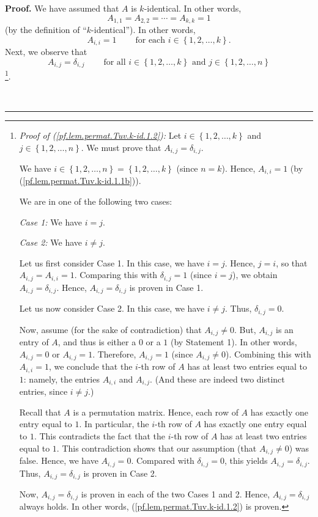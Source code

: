 \documentclass[numbers=enddot,12pt,final,onecolumn,notitlepage]{scrartcl}%
\theoremstyle{definition}
\newenvironment{proof}[1][Proof]{\noindent\textbf{#1.} }{\ \rule{0.5em}{0.5em}}
\begin{document}
\begin{proof}
We have assumed that $A$ is $k$-identical. In other words,%
\begin{equation}
A_{1,1}=A_{2,2}=\cdots=A_{k,k}=1 \label{pf.lem.permat.Tuv.k-id.1.1}%
\end{equation}
(by the definition of \textquotedblleft$k$-identical\textquotedblright). In
other words,%
\begin{equation}
A_{i,i}=1\ \ \ \ \ \ \ \ \ \ \text{for each }i\in\left\{  1,2,\ldots
,k\right\}  . \label{pf.lem.permat.Tuv.k-id.1.1b}%
\end{equation}
Next, we observe that%
\begin{equation}
A_{i,j}=\delta_{i,j}\ \ \ \ \ \ \ \ \ \ \text{for all }i\in\left\{
1,2,\ldots,k\right\}  \text{ and }j\in\left\{  1,2,\ldots,n\right\}
\label{pf.lem.permat.Tuv.k-id.1.2}%
\end{equation}
\footnote{\textit{Proof of (\ref{pf.lem.permat.Tuv.k-id.1.2}):} Let
$i\in\left\{  1,2,\ldots,k\right\}  $ and $j\in\left\{  1,2,\ldots,n\right\}
$. We must prove that $A_{i,j}=\delta_{i,j}$.
\par
We have $i\in\left\{  1,2,\ldots,n\right\}  =\left\{  1,2,\ldots,k\right\}  $
(since $n=k$). Hence, $A_{i,i}=1$ (by (\ref{pf.lem.permat.Tuv.k-id.1.1b})).
\par
We are in one of the following two cases:
\par
\textit{Case 1:} We have $i=j$.
\par
\textit{Case 2:} We have $i\neq j$.
\par
Let us first consider Case 1. In this case, we have $i=j$. Hence, $j=i$, so
that $A_{i,j}=A_{i,i}=1$. Comparing this with $\delta_{i,j}=1$ (since $i=j$),
we obtain $A_{i,j}=\delta_{i,j}$. Hence, $A_{i,j}=\delta_{i,j}$ is proven in
Case 1.
\par
Let us now consider Case 2. In this case, we have $i\neq j$. Thus,
$\delta_{i,j}=0$.
\par
Now, assume (for the sake of contradiction) that $A_{i,j}\neq0$. But,
$A_{i,j}$ is an entry of $A$, and thus is either a $0$ or a $1$ (by Statement
1). In other words, $A_{i,j}=0$ or $A_{i,j}=1$. Therefore, $A_{i,j}=1$ (since
$A_{i,j}\neq0$). Combining this with $A_{i,i}=1$, we conclude that the $i$-th
row of $A$ has at least two entries equal to $1$: namely, the entries
$A_{i,i}$ and $A_{i,j}$. (And these are indeed two distinct entries, since
$i\neq j$.)
\par
Recall that $A$ is a permutation matrix. Hence, each row of $A$ has exactly
one entry equal to $1$. In particular, the $i$-th row of $A$ has exactly one
entry equal to $1$. This contradicts the fact that the $i$-th row of $A$ has
at least two entries equal to $1$. This contradiction shows that our
assumption (that $A_{i,j}\neq0$) was false. Hence, we have $A_{i,j}=0$.
Compared with $\delta_{i,j}=0$, this yields $A_{i,j}=\delta_{i,j}$. Thus,
$A_{i,j}=\delta_{i,j}$ is proven in Case 2.
\par
Now, $A_{i,j}=\delta_{i,j}$ is proven in each of the two Cases 1 and 2. Hence,
$A_{i,j}=\delta_{i,j}$ always holds. In other words,
(\ref{pf.lem.permat.Tuv.k-id.1.2}) is proven.}.


\end{proof}
\end{document}
